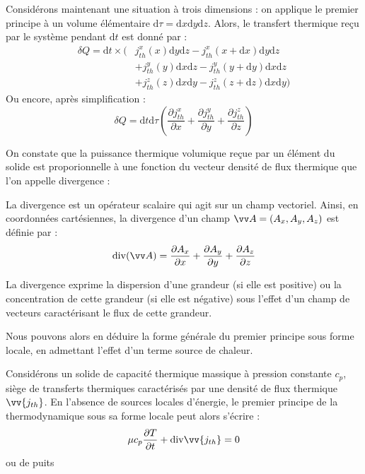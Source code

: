 \documentclass[11pt,fleqn]{book} %
\newcommand{\dd}{\mathrm{d}}
\renewcommand{\div}{\mathrm{div}}
\begin{document}
Considérons maintenant une situation à trois dimensions : on applique le premier principe à un volume élémentaire $\dd \tau = \dd x \dd y \dd z$. Alors, le transfert thermique reçu par le système pendant $\dd t$ est donné par :
\begin{align}
	\delta Q = \dd t \times ( &j_{th}^x(x)\dd y \dd z-j_{th}^x(x+\dd x)\dd y \dd z \\
	&+ j_{th}^y(y)\dd x \dd z-j_{th}^y(y+\dd y)\dd x \dd z \\
	&+ j_{th}^z(z)\dd x \dd y-j_{th}^z(z+\dd z)\dd x \dd y )
\end{align}
Ou encore, après simplification :
\begin{equation}
	\delta Q = \dd t \dd \tau \left( \frac{\partial j_{th}^x}{\partial x} + \frac{\partial j_{th}^y}{\partial y} + \frac{\partial j_{th}^z}{\partial z} \right)
\end{equation}

On constate que la puissance thermique volumique reçue par un élément du solide est proporionnelle à une fonction du vecteur densité de flux thermique que l'on appelle divergence :

\begin{definition}[Divergence]
	La divergence est un opérateur scalaire qui agit sur un champ vectoriel. Ainsi, en coordonnées cartésiennes, la divergence d'un champ $\vv A = (A_x,A_y,A_z)$ est définie par :
	\begin{equation}
		\div(\vv A) = \frac{\partial A_x}{\partial x} + \frac{\partial A_y}{\partial y} + \frac{\partial A_z}{\partial z}
	\end{equation}
\end{definition}

\begin{proposition}
	La divergence exprime la dispersion d'une grandeur (si elle est positive) ou la concentration de cette grandeur (si elle est négative) sous l'effet d'un champ de vecteurs caractérisant le flux de cette grandeur. 
\end{proposition}

Nous pouvons alors en déduire la forme générale du premier principe sous forme locale, en admettant l'effet d'un terme source de chaleur.

\begin{theorem}
	Considérons un solide de capacité thermique massique à pression constante $c_p$, siège de transferts thermiques caractérisés par une densité de flux thermique $\vv{j_{th}}$. En l'absence de sources locales d'énergie, le premier principe de la thermodynamique sous sa forme locale peut alors s'écrire :
	\begin{equation}
		\mu c_p \frac{\partial T}{\partial t} + \div \vv{j_{th}} = 0
	\end{equation}ou de puits
\end{theorem}
\end{document}
